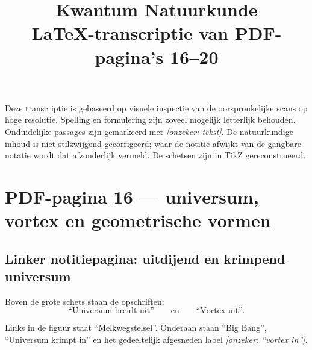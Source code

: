 \documentclass[11pt,a4paper]{article}
\title{\textbf{Kwantum Natuurkunde}\\
\large LaTeX-transcriptie van PDF-pagina's 16--20}
\author{}
\date{}
\newcommand{\uncertain}[1]{\textcolor{uncertain}{\textit{[onzeker: #1]}}}
\begin{document}
\maketitle

\noindent
Deze transcriptie is gebaseerd op visuele inspectie van de oorspronkelijke
scans op hoge resolutie. Spelling en formulering zijn zoveel mogelijk letterlijk
behouden. Onduidelijke passages zijn gemarkeerd met \uncertain{tekst}. De
natuurkundige inhoud is niet stilzwijgend gecorrigeerd; waar de notitie afwijkt
van de gangbare notatie wordt dat afzonderlijk vermeld. De schetsen zijn in
TikZ gereconstrueerd.

\section*{PDF-pagina 16 --- universum, vortex en geometrische vormen}

\subsection*{Linker notitiepagina: uitdijend en krimpend universum}

Boven de grote schets staan de opschriften:
\[
\text{``Universum breidt uit''}
\qquad\text{en}\qquad
\text{``Vortex uit''}.
\]

Links in de figuur staat ``Melkwegstelsel''. Onderaan staan ``Big Bang'',
``Universum krimpt in'' en het gedeeltelijk afgesneden label
\uncertain{``vortex in''}.
\end{document}
